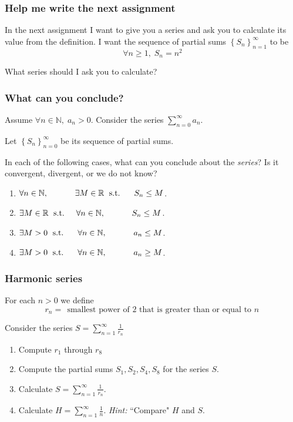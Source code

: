 \documentclass[14pt]{beamer}
\newcommand {\DS} [1] {${\displaystyle #1}$}
\newcommand {\R}{\mathbb{R}}
\newcommand {\N}{\mathbb{N}}
\newcommand{\setsize}[1]{\fontsize{#1}{#1}\selectfont} %
\newcommand{\smallerfont}{\setsize{13}} %
\newcommand{\vv}{\vspace{.5cm}}
\begin{document}
\begin{frame}[t]
\frametitle{Help me write the next assignment}

In the next assignment I want to give you a series and ask you to calculate its value from the definition.  I want the sequence of partial sums \DS{\left\{ S_n \right\}_{n=1}^{\infty}} to be
	$$
		\forall n \geq 1, \; S_n = n^2
	$$

What series should I ask you to calculate?


\end{frame}
\begin{frame}[t]
\smallerfont
\frametitle{What can you conclude?}

Assume \DS{\forall n \in \N, \; a_n >0}.  Consider the series \DS{\sum_{n=0}^{\infty} a_n}.

Let \DS{\left\{ S_n \right\}_{n=0}^{\infty}} be its sequence of partial sums.
\vv

In each of the following cases, what can you conclude about the \emph{series}?  Is it convergent, divergent, or we do not know?
\vv

\begin{enumerate}
	\item \DS{\forall n \in \N, \; \mbox{ \phantom{s.t.} } \quad \exists M \in \R \; \mbox{ s.t. } \; \quad S_n \leq M}.
	\item \DS{\exists M \in \R \; \mbox{ s.t. } \quad \forall n \in \N, \; \mbox{ \phantom{s.t.} }  \quad S_n \leq M}.
	\item \DS{\exists M >0 \; \mbox{ s.t. } \; \quad \forall n \in \N, \; \mbox{ \phantom{s.t.} } \quad  a_n \leq M}.
	\item \DS{\exists M >0 \; \mbox{ s.t. } \; \quad \forall n \in \N, \; \mbox{ \phantom{s.t.} } \quad a_n \geq M}.
\end{enumerate}

\end{frame}
\begin{frame}[t]
\smallerfont
\frametitle{Harmonic series}

For each $n >0$ we define
	$$
		r_n = \;  \, \mbox{smallest power of $2$ that is greater than or equal to $n$} \, 
	$$
\vspace{-.7cm}

Consider the series \DS{S = \sum_{n=1}^{\infty} \frac{1}{r_n}}
\vspace{.2cm}

	\begin{enumerate}
		\item Compute \DS{r_1} through \DS{r_8}
\vv
		\item Compute the partial sums \DS{S_1, S_2, S_4, S_8} for the series $S$.
\vspace{.2cm}
		\item Calculate \DS{S = \sum_{n=1}^{\infty} \frac{1}{r_n}}.
		\item  Calculate \DS{H = \sum_{n=1}^{\infty} \frac{1}{n}}.
		\hfill
			\emph{Hint:} ``Compare" $H$ and $S$.
	\end{enumerate}

\end{frame}
\end{document}
